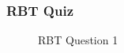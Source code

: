 \documentclass{article}
\begin{document}
\subsubsection{RBT Quiz}


\begin{figure}[H]
    \centering
    \caption{RBT Question 1}
    \label{fig:sidebyside}
\end{figure}
\end{document}
